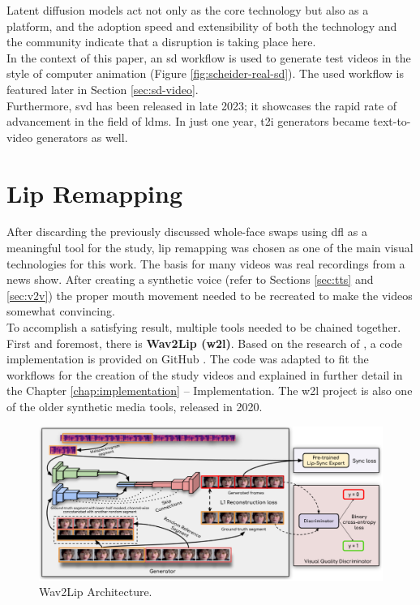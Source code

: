 \documentclass[
  a4paper,  %
  twoside,  %
  bibliography=totoc,
  headsepline,
  cleardoublepage=empty,
  parskip=half,
  draft=false
]{scrbook}
\begin{document}
Latent diffusion models act not only as the core technology but also as a platform, and the adoption speed and extensibility of both the technology and the community indicate that a disruption is taking place here. \\
In the context of this paper, an \gls{sd} workflow is used to generate test videos in the style of computer animation (Figure \ref{fig:scheider-real-sd}). The used workflow is featured later in Section \ref{sec:sd-video}. \\
Furthermore, \gls{svd} has been released in late 2023; it showcases the rapid rate of advancement in the field of \gls{ldm}s. In just one year, \gls{t2i} generators became text-to-video generators as well.


\section{Lip Remapping}
\label{sec:lips}
After discarding the previously discussed whole-face swaps using \gls{dfl} as a meaningful tool for the study, lip remapping was chosen as one of the main visual technologies for this work. The basis for many videos was real recordings from a news show. After creating a synthetic voice (refer to Sections \ref{sec:tts} and \ref{sec:v2v}) the proper mouth movement needed to be recreated to make the videos somewhat convincing. \\
To accomplish a satisfying result, multiple tools needed to be chained together. First and foremost, there is \textbf{Wav2Lip (\gls{w2l})}. Based on the research of \citet{prajwalLipSyncExpert2020}, a code implementation is provided on GitHub \cite{mukhopadhyayWav2LipAccuratelyLipsyncing2023}. The code was adapted to fit the workflows for the creation of the study videos and explained in further detail in the Chapter \ref{chap:implementation} – Implementation. The \gls{w2l} project is also one of the older synthetic media tools, released in 2020.

\begin{figure}[h]
  \centering
  \includegraphics[width=1\textwidth]{./graphics/w2l-arch.png}
  \caption{Wav2Lip Architecture.}
  \label{fig:wav2lip-arch}
\end{figure}
\end{document}
